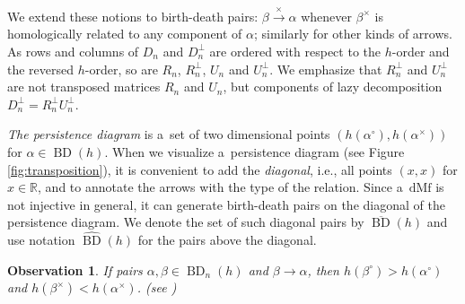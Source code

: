 \documentclass[a4paper,12pt, USenglish,cleveref,autoref,thm-restate]{article}
\newtheorem{observation}[theorem]{Observation}
\newcommand\rc[2]{\textcolor{blue}{#2(#1)}}
\newcommand{\mf}{h}
\DeclareMathOperator{\bd}{BD}
\newcommand{\diagbd}{\overline{\bd}}
\newcommand{\upbd}{\hat{\bd}}
\newcommand{\dmf}{\text{dMf}}
\newcommand{\mU}{U}
\newcommand{\hmU}{\mU}
\newcommand{\cmU}{\mU^{\perp}}
\newcommand{\hmB}{D}
\newcommand{\cmB}{D^{\perp}}
\newcommand{\hmR}{R}
\newcommand{\cmR}{R^{\perp}}
\newcommand{\bth}[1]{#1^\circ}
\newcommand{\dth}[1]{#1^{\!\times}}
\newcommand{\homo}{\xrightarrow{\times}}
\newcommand{\rel}{\rightarrow}
\newcommand{\RR}{\mathbb{R}}
\newcommand{\bds}{\alpha}
\newcommand{\bdt}{\beta}
\begin{document}
\noindent We extend these notions to birth-death pairs: $\bdt \homo \bds$ whenever $\dth\bdt$ is homologically related to any component of $\bds$; similarly for other kinds of arrows. 
As rows and columns of $\hmB_{n}$ and $\cmB_{n}$ are ordered with respect to the $\mf$-order and the reversed $\mf$-order, so are $\hmR_{n}$, $\cmR_{n}$, $\hmU_{n}$ and $\cmU_{n}$. We emphasize that $\cmR_{n}$ and $\cmU_{n}$ are not transposed matrices $\hmR_{n}$ and $\hmU_{n}$, but components of lazy decomposition $\cmB_n = \cmR_{n} \cmU_n$.





\noindent \emph{The persistence diagram} is a~set of two dimensional points $(\mf(\bth\bds),\mf(\dth\bds))$ for $\bds \in \bd(\mf)$. When we visualize a~persistence diagram (see Figure \ref{fig:transposition}), it is convenient to add the \emph{diagonal}, i.e., all points $(x,x)$ for $x \in \RR$, and to annotate the arrows with the type of the relation. Since a~$\dmf$ is not injective in general, it can generate birth-death pairs on the diagonal of the persistence diagram.  We denote the set of such diagonal pairs by $\diagbd(\mf)$ and use notation $\upbd(\mf)$ for the pairs above the diagonal. 


\begin{observation}\label{obs:left_up_corner}
    If pairs $\bds,\bdt \in \bd_{n}(\mf)$ and $\bdt \rel \bds$,  then $\mf(\bth\bdt) > \mf(\bth\bds)$ and $\mf(\dth\bdt) < \mf(\dth\bds)$. (see \cite[Lemma 2.1]{BigSteps})
\end{observation}

\end{document}
